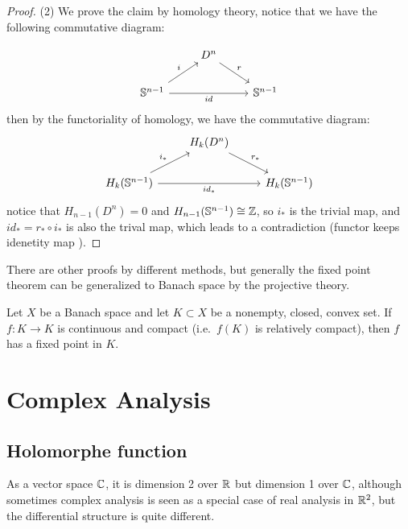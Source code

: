 \documentclass[12pt,a4paper]{article}
\begin{document}
\begin{proof}
    (2) We prove the claim by homology theory, notice that we have the following commutative diagram:
    
\[\begin{tikzcd}
	& {D^n} \\
	{\mathbb{S}^{n-1}} && {\mathbb{S}^{n-1}}
	\arrow["r", from=1-2, to=2-3]
	\arrow["i", from=2-1, to=1-2]
	\arrow["id"', from=2-1, to=2-3]
\end{tikzcd}\]
    then by the functoriality of homology, we have the commutative diagram:
\[\begin{tikzcd}
	& {H_k(D^n)} \\
	{H_k(\mathbb{S}^{n-1})} && {H_k(\mathbb{S}^{n-1})}
	\arrow["{r_*}", from=1-2, to=2-3]
	\arrow["{i_*}", from=2-1, to=1-2]
	\arrow["{id_*}"', from=2-1, to=2-3]
\end{tikzcd}\]
    notice that \(H_{n-1}(D^n) = 0\) and \(H_{n-1}(\mathbb{S}^{n-1}) \cong \mathbb{Z}\), so \(i_*\) is the trivial map, and \(id_* = r_* \circ i_*\) is also the trival map, which leads to a contradiction (functor keeps idenetity map ).




\end{proof}

There are other proofs by different methods, but generally the fixed point theorem can be generalized to Banach space by the projective theory.

\begin{theorem}[Schauder]
    Let $X$ be a Banach space and let $K \subset X$ be a nonempty, closed, convex set.
If $f : K \to K$ is continuous and compact (i.e.\ $f(K)$ is relatively compact),
then $f$ has a fixed point in $K$.
\end{theorem}

\newpage
\section{Complex Analysis}
\subsection{Holomorphe function}

As a vector space \(\mathbb{C}\), it is dimension 2 over \(\mathbb{R}\) but dimension 1 over \(\mathbb{C}\), although sometimes complex analysis is seen as a special case of real analysis in \(\mathbb{R}^2\), but the differential structure is quite different.
\end{document}
